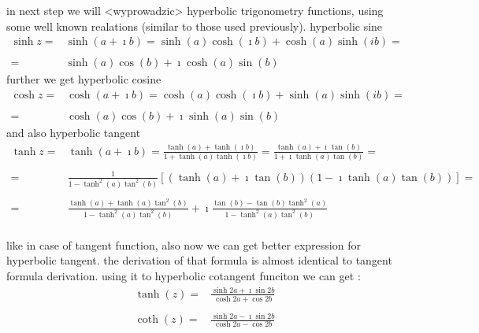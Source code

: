 \documentclass[11pt,a4paper,openany,oneside]{extreport}
\begin{document}
in next step we will <wyprowadzic> hyperbolic trigonometry functions, using some well known realations (similar to those used previously).
hyperbolic sine
 \begin{displaymath}
  \begin{array}{rl}
  \sinh{z} = & \sinh{(a+\imath b)} = \sinh{(a)}\cosh{(\imath b)} + \cosh{(a)}\sinh{(ib)} = \\
  \ & \ \\
  = & \sinh{(a)}\cos{(b)} + \imath \cosh{(a)}\sin{(b)}
  \end{array}
 \end{displaymath}
further we get hyperbolic cosine
 \begin{displaymath} 
  \begin{array}{rl}  
  \cosh{z} = & \cosh{(a+\imath b)} = \cosh{(a)}\cosh{(\imath b)} + \sinh{(a)}\sinh{(ib)} = \\
  \ & \ \\
  = & \cosh{(a)}\cos{(b)} + \imath \sinh{(a)}\sin{(b)}
  \end{array}
 \end{displaymath}
and also hyperbolic tangent
 \begin{displaymath}
  \begin{array}{rl}
	\tanh{z} = & \tanh{(a+\imath b)} = \frac{ \tanh(a) + \tanh(\imath b) }{1+ \tanh(a)\tanh(\imath b) } = \frac{ \tanh(a) + \imath \tan(b) }{1+ \imath \tanh(a)\tan(b) } = \\ 
   \ & \ \\
   = & \frac{1}{1 - \tanh^2(a)\tan^2(b) }\left[ (\tanh(a)+\imath \tan(b))(1-\imath \tanh(a)\tan(b)) \right]=\\
   \ & \ \\
   = & \frac{\tanh(a) + \tanh(a)\tan^2(b)}{1 - \tanh^2(a)\tan^2(b) } + \imath \frac{\tan(b)-\tan(b)\tanh^2(a)}{1 - \tanh^2(a)\tan^2(b) } \\
  \end{array}
 \end{displaymath}

like in case of tangent function, also now we can get better expression for hyperbolic tangent. the derivation of that formula is almost identical to tangent formula derivation. using it to hyperbolic cotangent funciton we can get :
\begin{displaymath}
  \begin{array}{rl}  
   \tanh(z) = & \frac{ \sinh{2a} + \imath \sin{2b} }{ \cosh{2a} + \cos{2b} } \\
   \ &\ \\
   \coth(z) = & \frac{ \sinh{2a} - \imath \sin{2b} }{ \cosh{2a} - \cos{2b} } \\   
  \end{array}
\end{displaymath}
\end{document}
